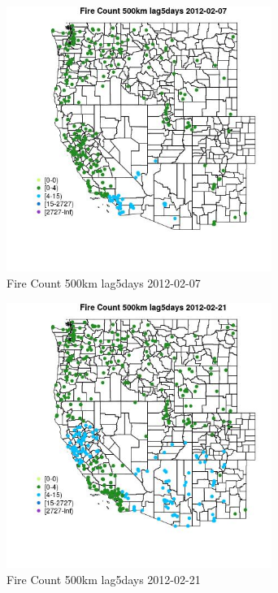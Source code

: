 \begin{figure} 
\centering  
\includegraphics[width=0.77\textwidth]{Code_Outputs/Report_ML_input_PM25_Step4_part_f_de_duplicated_aves_prioritize_24hr_obswNAs_MapObsFire_Count_500km_lag5days2012-02-07.jpg} 
\caption{\label{fig:Report_ML_input_PM25_Step4_part_f_de_duplicated_aves_prioritize_24hr_obswNAsMapObsFire_Count_500km_lag5days2012-02-07}Fire Count 500km lag5days 2012-02-07} 
\end{figure} 
 

\begin{figure} 
\centering  
\includegraphics[width=0.77\textwidth]{Code_Outputs/Report_ML_input_PM25_Step4_part_f_de_duplicated_aves_prioritize_24hr_obswNAs_MapObsFire_Count_500km_lag5days2012-02-21.jpg} 
\caption{\label{fig:Report_ML_input_PM25_Step4_part_f_de_duplicated_aves_prioritize_24hr_obswNAsMapObsFire_Count_500km_lag5days2012-02-21}Fire Count 500km lag5days 2012-02-21} 
\end{figure} 
 

